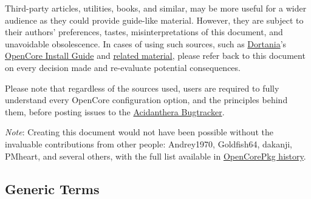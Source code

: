 \documentclass[]{article}
\makeatletter
\renewcommand{\label}[1]{%
\zref@wrapper@immediate{\oldlabel{#1}}}  %
\makeatother
\begin{document}
Third-party articles, utilities, books, and similar, may be more useful for a wider audience as
they could provide guide-like material. However, they are subject to their authors' preferences,
tastes, misinterpretations of this document, and unavoidable obsolescence.
In cases of using such sources, such as \href{https://dortania.github.io}{Dortania}'s
\href{https://dortania.github.io/OpenCore-Install-Guide}{OpenCore Install Guide}
and \href{https://dortania.github.io/getting-started}{related material},
please refer back to this document on every decision made and re-evaluate potential consequences.

Please note that regardless of the sources used, users are required to fully understand every
OpenCore configuration option, and the principles behind them, before posting issues to the
\href{https://github.com/acidanthera/bugtracker}{Acidanthera Bugtracker}.

\emph{Note}: Creating this document would not have been possible without the invaluable
contributions from other people: Andrey1970, Goldfish64, dakanji, PMheart, and several others,
with the full list available in
\href{https://github.com/acidanthera/OpenCorePkg/commits/master/Docs}{OpenCorePkg history}.

\subsection{Generic Terms}\label{generic-terms}
\end{document}
